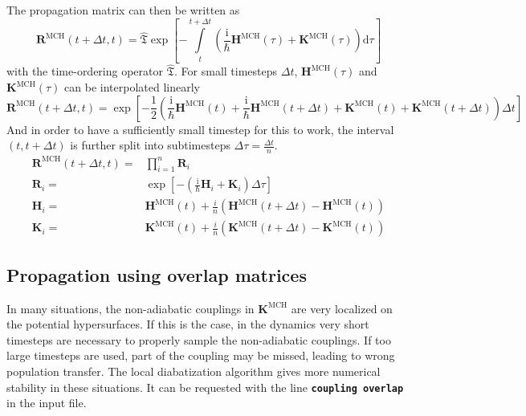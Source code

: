 \documentclass[a4paper,11pt,DIV=15,openany,twoside=false]{scrbook}
\newcommand{\ttt}[1]{\textbf{\texttt{#1}}}
\newcommand{\I}{\ensuremath{\mathrm{i}}}
\newcommand{\D}{\ensuremath{\mathrm{d}}}
\newcommand{\VEC}[1]{\ensuremath{\mathbf{#1}}}
\begin{document}
The propagation matrix can then be written as 
\begin{equation}
  \VEC{R}^{\text{MCH}}(t+\Delta t,t)=
  \hat{\mathfrak{T}}
  \exp\left[
    -\int\limits_{t}^{t+\Delta t}
    \left(
      \frac{\I}{\hbar}\VEC{H}^{\text{MCH}}(\tau)+\VEC{K}^{\text{MCH}}(\tau) 
    \right)\D\tau
  \right]
\end{equation}
with the time-ordering operator $\hat{\mathfrak{T}}$. For small timesteps $\Delta t$, $\VEC{H}^{\text{MCH}}(\tau)$ and $\VEC{K}^{\text{MCH}}(\tau)$ can be interpolated linearly
\begin{equation}
  \VEC{R}^{\text{MCH}}(t+\Delta t,t)=
  \exp\left[
    -\frac{1}{2}\left(
      \frac{\I}{\hbar}\VEC{H}^{\text{MCH}}(t)+\frac{\I}{\hbar}\VEC{H}^{\text{MCH}}(t+\Delta t)
      +\VEC{K}^{\text{MCH}}(t)+\VEC{K}^{\text{MCH}}(t+\Delta t)
    \right)\Delta t
  \right]
\end{equation}
And in order to have a sufficiently small timestep for this to work, the interval $(t,t+\Delta t)$ is further split into subtimesteps $\Delta\tau=\frac{\Delta t}{n}$. 
\begin{align}
  \VEC{R}^{\text{MCH}}(t+\Delta t,t)=&
  \prod\limits_{i=1}^{n}
  \VEC{R}_i\\
  \VEC{R}_i=&
  \exp\left[
      -\left(
        \frac{\I}{\hbar}\VEC{H}_i
        +\VEC{K}_i
      \right)\Delta\tau
  \right]\\
  \VEC{H}_i=&
  \VEC{H}^{\text{MCH}}(t) + \frac{i}{n}
  \left(
    \VEC{H}^{\text{MCH}}(t+\Delta t)-\VEC{H}^{\text{MCH}}(t)
  \right)\label{eq:ham_propn}\\
  \VEC{K}_i=&
  \VEC{K}^{\text{MCH}}(t) + \frac{i}{n}
  \left(
    \VEC{K}^{\text{MCH}}(t+\Delta t)-\VEC{K}^{\text{MCH}}(t)
  \right)
\end{align}

\subsection{Propagation using overlap matrices}

In many situations, the non-adiabatic couplings in $\VEC{K}^{\text{MCH}}$ are very localized on the potential hypersurfaces. If this is the case, in the dynamics very short timesteps are necessary to properly sample the non-adiabatic couplings. If too large timesteps are used, part of the coupling may be missed, leading to wrong population transfer. The local diabatization algorithm gives more numerical stability in these situations. It can be requested with the line \ttt{coupling overlap} in the input file.
\end{document}
